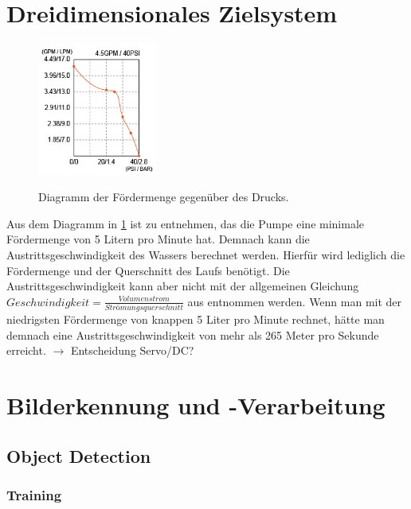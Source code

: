 \section{Dreidimensionales Zielsystem} \label{cap:dreidim}

\begin{figure}
    \centering
    \includegraphics[width=0.35\textwidth]{images/seaflo_lpm_psi.png}
    \label{fig:psi_seaflo}
    \caption{Diagramm der Fördermenge gegenüber des Drucks. \cite{seaflo_pump}}
\end{figure}
Aus dem Diagramm in \ref{fig:psi_seaflo} ist zu entnehmen, das die Pumpe eine minimale Fördermenge von 5 Litern pro Minute hat. Demnach kann die Austrittsgeschwindigkeit des Wassers berechnet werden. Hierfür wird lediglich die Fördermenge und der Querschnitt des Laufs benötigt. Die Austrittsgeschwindigkeit kann aber nicht mit der allgemeinen Gleichung $ Geschwindigkeit = \frac{Volumenstrom}{Strömungsquerschnitt}
$ aus \cite{stroemungen} entnommen werden. 
Wenn man mit der niedrigsten Fördermenge von knappen 5 Liter pro Minute rechnet, hätte man demnach eine Austrittsgeschwindigkeit von mehr als 265 Meter pro Sekunde erreicht.
$\rightarrow$ Entscheidung Servo/DC?


\section{Bilderkennung und -Verarbeitung}

\subsection{Object Detection}

\subsubsection{Training}

